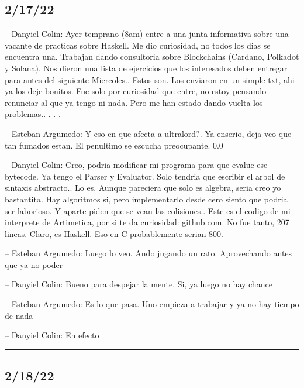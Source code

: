 \hypertarget{section-9}{%
\subsection{2/17/22}\label{section-9}}

-- Danyiel Colin: Ayer temprano (8am) entre a una junta informativa
sobre una vacante de practicas sobre Haskell. Me dio curiosidad, no
todos los dias se encuentra una. Trabajan dando consultoria sobre
Blockchains (Cardano, Polkadot y Solana). Nos dieron una lista de
ejercicios que los interesados deben entregar para antes del siguiente
Miercoles.. Estos son. Los enviaron en un simple txt, ahi ya los deje
bonitos. Fue solo por curiosidad que entre, no estoy pensando renunciar
al que ya tengo ni nada. Pero me han estado dando vuelta los problemas..
. . .

-- Esteban Argumedo: Y eso en que afecta a ultralord?. Ya enserio, deja
veo que tan fumados estan. El penultimo se escucha preocupante. 0.0

-- Danyiel Colin: Creo, podria modificar mi programa para que evalue ese
bytecode. Ya tengo el Parser y Evaluator. Solo tendria que escribir el
arbol de sintaxis abstracto.. Lo es. Aunque pareciera que solo es
algebra, seria creo yo bastantita. Hay algoritmos si, pero implementarlo
desde cero siento que podria ser laborioso. Y aparte piden que se vean
las colisiones.. Este es el codigo de mi interprete de Artimetica, por
si te da curiosidad:
\href{https://github.com/DanEscher98/Functional-Notes/tree/main/Techniques/Pure-IO/EasyEvaluator_hs}{github.com}.
No fue tanto, 207 lineas. Claro, es Haskell. Eso en C probablemente
serian 800.

-- Esteban Argumedo: Luego lo veo. Ando jugando un rato. Aprovechando
antes que ya no poder

-- Danyiel Colin: Bueno para despejar la mente. Si, ya luego no hay
chance

-- Esteban Argumedo: Es lo que pasa. Uno empieza a trabajar y ya no hay
tiempo de nada

-- Danyiel Colin: En efecto

\begin{center}\rule{0.5\linewidth}{0.5pt}\end{center}

\hypertarget{section-10}{%
\subsection{2/18/22}\label{section-10}}

